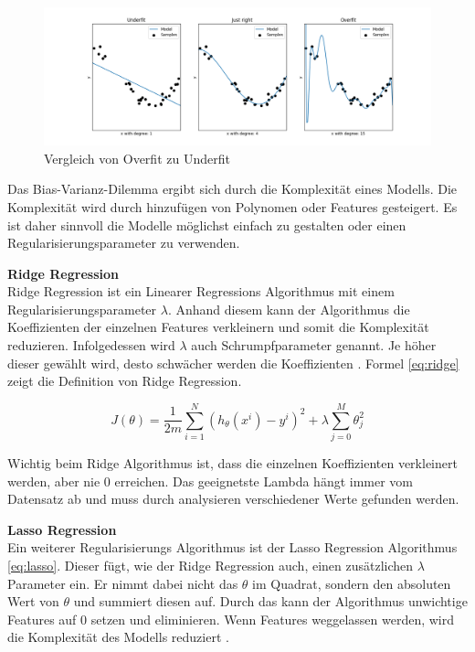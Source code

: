 \begin{figure}[ht]
\centering
\includegraphics[width=\textwidth]{images/overfit_underfit.png}
\caption[Vergleich von Overfit zu Underfit]{Vergleich von Overfit zu Underfit}
\label{fig:under_overfit}
\end{figure}

Das Bias-Varianz-Dilemma ergibt sich durch die Komplexität eines Modells. Die Komplexität wird durch hinzufügen von Polynomen oder Features gesteigert.
Es ist daher sinnvoll die Modelle möglichst einfach zu gestalten oder einen Regularisierungsparameter zu verwenden.

\textbf{Ridge Regression}\\
Ridge Regression ist ein Linearer Regressions Algorithmus mit einem Regularisierungsparameter $\lambda$. Anhand diesem kann der Algorithmus die Koeffizienten der einzelnen Features verkleinern und somit die Komplexität reduzieren. Infolgedessen wird $\lambda$ auch Schrumpfparameter genannt. Je höher dieser gewählt wird, desto schwächer werden die Koeffizienten \cite{ridge, ridge_2}. Formel \eqref{eq:ridge} zeigt die Definition von Ridge Regression.

\begin{equation}
\label{eq:ridge}
J(\theta) = \frac{1}{2m} \sum_{i=1}^{N} (h_\theta(x^i) - y^i)^2 + \lambda \sum_{j=0}^{M} \theta_{j}^{2}
\end{equation}

Wichtig beim Ridge Algorithmus ist, dass die einzelnen Koeffizienten verkleinert werden, aber nie 0 erreichen. Das geeignetste Lambda hängt immer vom Datensatz ab und muss durch analysieren verschiedener Werte gefunden werden.

\textbf{Lasso Regression}\\
Ein weiterer Regularisierungs Algorithmus ist der Lasso Regression Algorithmus \eqref{eq:lasso}. Dieser fügt, wie der Ridge Regression auch, einen zusätzlichen $\lambda$ Parameter ein. Er nimmt dabei nicht das $\theta$ im Quadrat, sondern den absoluten Wert von $\theta$ und summiert diesen auf. Durch das kann der Algorithmus unwichtige Features auf 0 setzen und eliminieren. Wenn Features weggelassen werden, wird die Komplexität des Modells reduziert \cite{lasso}.

